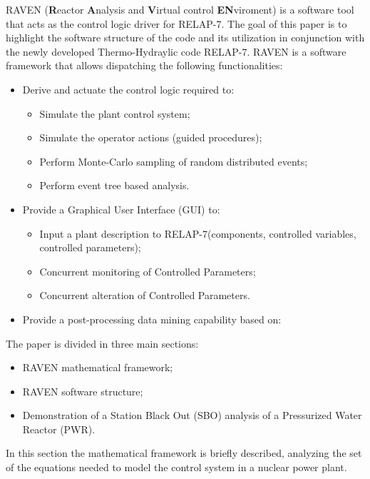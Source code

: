 \documentclass{mc2013}
\begin{document}
RAVEN (\textbf{R}eactor \textbf{A}nalysis and \textbf{V}irtual control \textbf{EN}viroment) is a software tool that acts as the control logic driver for RELAP-7. The goal of this paper is to highlight the software structure of the code and its utilization in conjunction with the newly developed Thermo-Hydraylic code RELAP-7. RAVEN is a software framework that allows dispatching the following functionalities:
\begin{itemize}
\item Derive and actuate the control logic required to:
\begin{itemize}
\item Simulate the plant control system;
\item Simulate the operator actions (guided procedures);
\item Perform Monte-Carlo sampling of random distributed events;
\item Perform event tree based analysis.
\end{itemize}
\item Provide a Graphical User Interface (GUI) to:
\begin{itemize}
\item Input a plant description to RELAP-7(components, controlled variables, controlled
parameters);
\item Concurrent monitoring of Controlled Parameters;
\item Concurrent alteration of Controlled Parameters.
\end{itemize}
\item Provide a post-processing data mining capability based on:
\end{itemize}
The paper is divided in three main sections:
\begin{itemize}
\item RAVEN mathematical framework;
\item RAVEN software structure;
\item Demonstration of a Station Black Out (SBO) analysis of a Pressurized Water Reactor (PWR).
\end{itemize}

\label{sec:mathFramework}

In this section the mathematical framework is briefly described, analyzing the set of the
equations needed to model the control system in a nuclear power plant.
\end{document}
